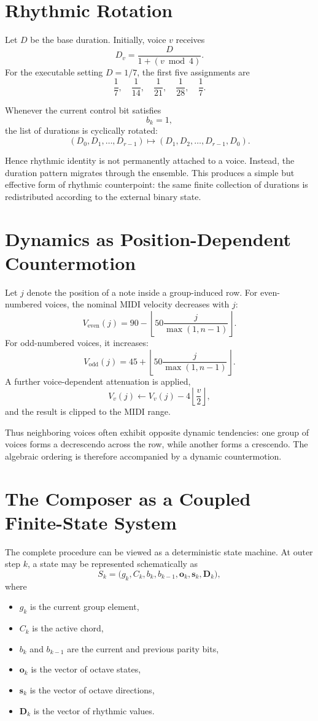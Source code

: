 \documentclass[11pt,a4paper]{article}
\begin{document}
\section{Rhythmic Rotation}

Let $D$ be the base duration. Initially, voice $v$ receives
\[
D_v=\frac{D}{1+(v\bmod 4)}.
\]
For the executable setting $D=1/7$, the first five assignments are
\[
\frac17,\quad \frac1{14},\quad \frac1{21},\quad \frac1{28},\quad \frac17.
\]

Whenever the current control bit satisfies
\[
b_k=1,
\]
the list of durations is cyclically rotated:
\[
(D_0,D_1,\ldots,D_{r-1})
\longmapsto
(D_1,D_2,\ldots,D_{r-1},D_0).
\]

Hence rhythmic identity is not permanently attached to a voice. Instead, the duration pattern migrates through the ensemble. This produces a simple but effective form of rhythmic counterpoint: the same finite collection of durations is redistributed according to the external binary state.

\section{Dynamics as Position-Dependent Countermotion}

Let $j$ denote the position of a note inside a group-induced row. For even-numbered voices, the nominal MIDI velocity decreases with $j$:
\[
V_{\mathrm{even}}(j)
=
90-
\left\lfloor
50\frac{j}{\max(1,n-1)}
\right\rfloor.
\]
For odd-numbered voices, it increases:
\[
V_{\mathrm{odd}}(j)
=
45+
\left\lfloor
50\frac{j}{\max(1,n-1)}
\right\rfloor.
\]
A further voice-dependent attenuation is applied,
\[
V_v(j)\leftarrow V_v(j)-4\left\lfloor\frac{v}{2}\right\rfloor,
\]
and the result is clipped to the MIDI range.

Thus neighboring voices often exhibit opposite dynamic tendencies: one group of voices forms a decrescendo across the row, while another forms a crescendo. The algebraic ordering is therefore accompanied by a dynamic countermotion.

\section{The Composer as a Coupled Finite-State System}

The complete procedure can be viewed as a deterministic state machine. At outer step $k$, a state may be represented schematically as
\[
S_k=
\bigl(
 g_k,
 C_k,
 b_k,
 b_{k-1},
 \mathbf{o}_k,
 \mathbf{s}_k,
 \mathbf{D}_k
\bigr),
\]
where
\begin{itemize}[leftmargin=1.5em]
    \item $g_k$ is the current group element,
    \item $C_k$ is the active chord,
    \item $b_k$ and $b_{k-1}$ are the current and previous parity bits,
    \item $\mathbf{o}_k$ is the vector of octave states,
    \item $\mathbf{s}_k$ is the vector of octave directions,
    \item $\mathbf{D}_k$ is the vector of rhythmic values.
\end{itemize}
\end{document}
